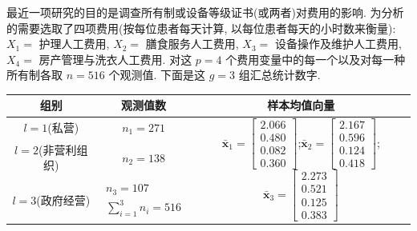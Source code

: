 最近一项研究的目的是调查所有制或设备等级证书(或两者)对费用的影响. 为分析的需要选取了四项费用(按每位患者每天计算, 以每位患者每天的小时数来衡量): $X_1=$ 护理人工费用, $X_2=$ 膳食服务人工费用, $X_3=$ 设备操作及维护人工费用, $X_4=$ 房产管理与洗衣人工费用. 对这 $p=4$ 个费用变量中的每一个以及对每一种所有制各取 $n=516$ 个观测值. 下面是这 $g=3$ 组汇总统计数字.

\begin{mvtable}
\begin{tabular}{ccc}
\toprule
组别 & 观测值数 & 样本均值向量\\
\midrule
$l=1$(私营) & $n_1=271$ & \multirow{3}{*}{$\bar{\mathbf{x}}_1=\begin{bmatrix}2.066\\0.480\\0.082\\0.360\end{bmatrix}$;\quad $\bar{\mathbf{x}}_2=\begin{bmatrix}2.167\\0.596\\0.124\\0.418\end{bmatrix}$;\quad $\bar{\mathbf{x}}_3=\begin{bmatrix}2.273\\0.521\\0.125\\0.383\end{bmatrix}$}\\[26pt]
$l=2$(非营利组织) & $n_2=138$ & \\[6pt]
$l=3$(政府经营) & $\begin{array}{c}n_3=107\\ \sum\limits_{i=1}^{3}n_i=516\end{array}$ & \\
\bottomrule
\end{tabular}
\end{mvtable}
